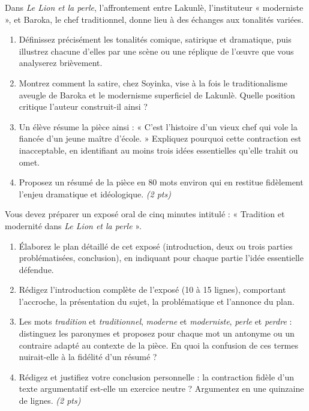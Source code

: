 \documentclass[11pt]{article}
\begin{document}
\begin{exercice}
Dans \emph{Le Lion et la perle}, l'affrontement entre Lakunlè, l'instituteur « moderniste », et Baroka, le chef traditionnel, donne lieu à des échanges aux tonalités variées.

\begin{enumerate}
  \item Définissez précisément les tonalités comique, satirique et dramatique, puis illustrez chacune d'elles par une scène ou une réplique de l'\oe uvre que vous analyserez brièvement.
  \item Montrez comment la satire, chez Soyinka, vise à la fois le traditionalisme aveugle de Baroka et le modernisme superficiel de Lakunlè. Quelle position critique l'auteur construit-il ainsi ?
  \item Un élève résume la pièce ainsi : « C'est l'histoire d'un vieux chef qui vole la fiancée d'un jeune maître d'école. » Expliquez pourquoi cette contraction est inacceptable, en identifiant au moins trois idées essentielles qu'elle trahit ou omet.
  \item Proposez un résumé de la pièce en 80 mots environ qui en restitue fidèlement l'enjeu dramatique et idéologique. \emph{(2 pts)}
\end{enumerate}
\end{exercice}

\begin{exercice}
Vous devez préparer un exposé oral de cinq minutes intitulé : « Tradition et modernité dans \emph{Le Lion et la perle} ».

\begin{enumerate}
  \item Élaborez le plan détaillé de cet exposé (introduction, deux ou trois parties problématisées, conclusion), en indiquant pour chaque partie l'idée essentielle défendue.
  \item Rédigez l'introduction complète de l'exposé (10 à 15 lignes), comportant l'accroche, la présentation du sujet, la problématique et l'annonce du plan.
  \item Les mots \emph{tradition} et \emph{traditionnel}, \emph{moderne} et \emph{moderniste}, \emph{perle} et \emph{perdre} : distinguez les paronymes et proposez pour chaque mot un antonyme ou un contraire adapté au contexte de la pièce. En quoi la confusion de ces termes nuirait-elle à la fidélité d'un résumé ?
  \item Rédigez et justifiez votre conclusion personnelle : la contraction fidèle d'un texte argumentatif est-elle un exercice neutre ? Argumentez en une quinzaine de lignes. \emph{(2 pts)}
\end{enumerate}
\end{exercice}
\end{document}
